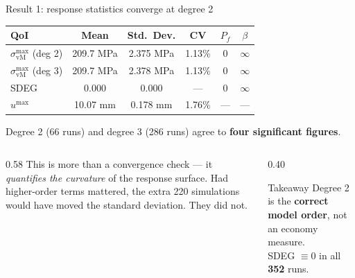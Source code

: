 \documentclass[aspectratio=169,11pt]{beamer}
\begin{document}
\begin{frame}{Result 1: response statistics converge at degree 2}
\begin{table}\centering\small
\begin{tabular}{lccccc}
\toprule
QoI & Mean & Std.\ Dev. & CV & $P_f$ & $\beta$ \\
\midrule
$\sigma_\text{vM}^\text{max}$ (deg 2) & 209.7 MPa & 2.375 MPa & 1.13\% & 0 & $\infty$ \\
$\sigma_\text{vM}^\text{max}$ (deg 3) & 209.7 MPa & 2.378 MPa & 1.13\% & 0 & $\infty$ \\
SDEG                                  & 0.000     & 0.000     & ---    & 0 & $\infty$ \\
$u^\text{max}$                        & 10.07 mm  & 0.178 mm  & 1.76\% & --- & --- \\
\bottomrule
\end{tabular}
\end{table}
Degree 2 (66 runs) and degree 3 (286 runs) agree to \textbf{four significant figures}.
\vspace{0.3em}

\begin{columns}[T]
\begin{column}{0.58\textwidth}
{\small This is more than a convergence check --- it \emph{quantifies the curvature} of the
response surface. Had higher-order terms mattered, the extra 220 simulations would have
moved the standard deviation. They did not.}
\end{column}
\begin{column}{0.40\textwidth}
\begin{alertblock}{Takeaway}
\footnotesize Degree 2 is the \textbf{correct model order}, not an economy measure.\\[0.2em]
SDEG $\equiv 0$ in all \textbf{352} runs.
\end{alertblock}
\end{column}
\end{columns}
\end{frame}
\end{document}
